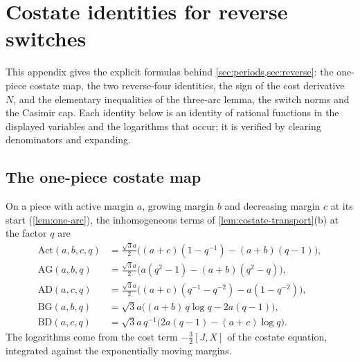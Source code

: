 \section{Costate identities for reverse switches}\label{app:reverse-estimates}

This appendix gives the explicit formulas behind \cref{sec:periods,sec:reverse}: the one-piece
costate map, the two reverse-four identities, the sign of the cost derivative $N$, and the
elementary inequalities of the three-arc lemma, the switch norms and the Casimir cap. Each
identity below is an identity of rational functions in the displayed variables and the
logarithms that occur; it is verified by clearing denominators and expanding.

\subsection{The one-piece costate map}\label{app:rev-one-arc}

On a piece with active margin $a$, growing margin $b$ and decreasing margin $c$ at its start
(\cref{lem:one-arc}), the inhomogeneous terms of \cref{lem:costate-transport}(b) at the factor
$q$ are
\begin{align*}
  \mathrm{Act}(a,b,c,q)&=\tfrac{\sqrt3a}{2}\bigl((a+c)(1-q^{-1})-(a+b)(q-1)\bigr),\\
  \mathrm{AG}(a,b,q)&=\tfrac{\sqrt3a}{2}\bigl(a(q^2-1)-(a+b)(q^2-q)\bigr),\\
  \mathrm{AD}(a,c,q)&=\tfrac{\sqrt3a}{2}\bigl((a+c)(q^{-1}-q^{-2})-a(1-q^{-2})\bigr),\\
  \mathrm{BG}(a,b,q)&=\sqrt3a\bigl((a+b)\,q\log q-2a(q-1)\bigr),\\
  \mathrm{BD}(a,c,q)&=\sqrt3a\,q^{-1}\bigl(2a(q-1)-(a+c)\log q\bigr).
\end{align*}
The logarithms come from the cost term $-\frac32[J,X]$ of the costate
equation, integrated against the exponentially moving margins.

